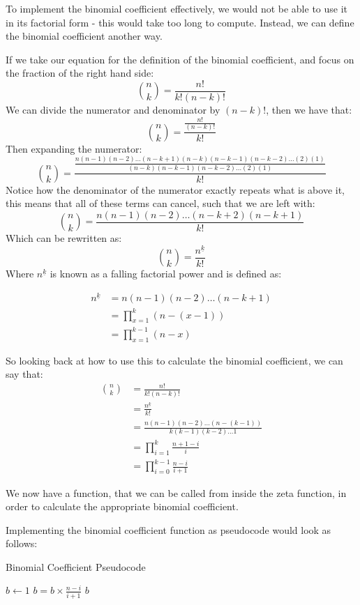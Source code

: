 \documentclass{article}
\begin{document}
To implement the binomial coefficient effectively, we would not be able to use it in its factorial form - this would take too long to compute. Instead, we can define the binomial coefficient another way.

If we take our equation for the definition of the binomial coefficient, and focus on the fraction of the right hand side:
$$\binom{n}{k} = \frac{n!}{k!(n-k)!}$$
We can divide the numerator and denominator by $(n-k)!$, then we have that:
$$\binom{n}{k} = \frac{\frac{n!}{(n-k)!}}{k!}$$
Then expanding the numerator:
$$\binom{n}{k} = \frac{\frac{n(n-1)(n-2)\dots(n-k+1)(n-k)(n-k-1)(n-k-2)\dots(2)(1)}{(n-k)(n-k-1)(n-k-2)\dots(2)(1)}}{k!}$$
Notice how the denominator of the numerator exactly repeats what is above it, this means that all of these terms can cancel, such that we are left with:
$$\binom{n}{k} = \frac{n(n-1)(n-2)\dots(n-k+2)(n-k+1)}{k!}$$
Which can be rewritten as:
$$\binom{n}{k} = \frac{n^{\underline{k}}}{k!}$$
Where $n^{\underline{k}}$ is known as a falling factorial power and is defined as:

\begin{align*}
    n^{\underline{k}} &= n(n-1)(n-2) \dots (n-k+1)\\
    &= \prod_{x=1}^k (n - (x - 1))\\
    &= \prod_{x=1}^{k-1} (n - x)
\end{align*}

So looking back at how to use this to calculate the binomial coefficient, we can say that:
\begin{align*}
    \binom{n}{k} &= \frac{n!}{k!(n-k)!}\\
    &= \frac{n^{\underline{k}}}{k!}\\
    &= \frac{n(n-1)(n-2)\dots (n-(k-1))}{k(k-1)(k-2) \dots 1}\\
    &= \prod^k_{i=1} \frac{n+1-i}{i}\\
    &= \prod^{k-1}_{i=0} \frac{n-i}{i+1}
\end{align*}

We now have a function, that we can be called from inside the zeta function, in order to calculate the appropriate binomial coefficient.

Implementing the binomial coefficient function as pseudocode would look as follows:

\begin{algorithm}[ht]
    \caption{Binomial Coefficient Pseudocode}
    \begin{algorithmic}
            \State $b \gets 1$
                \State $b = b \times \frac{n-i}{i+1}$
            \EndFor
            \State \Return $b$
        \EndFunction
    \end{algorithmic}
\end{algorithm}
\end{document}
